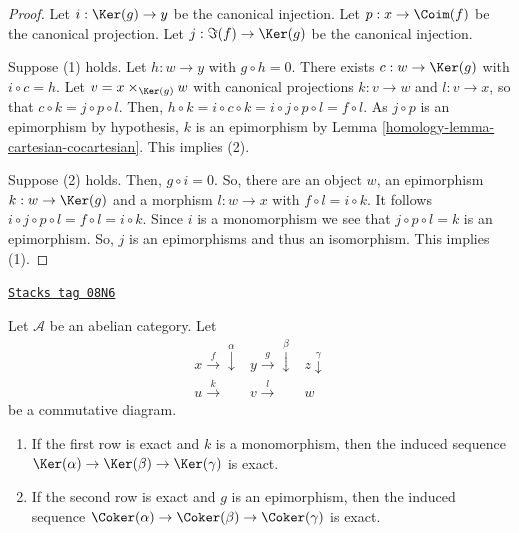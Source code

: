 \begin{proof}

Let $i:\Ker(g)\to y$ be the canonical injection. Let
$p:x\to\Coim(f)$ be the canonical projection. Let
$j:\Im(f)\to\Ker(g)$ be the canonical injection.

\medskip\noindent
Suppose (1) holds. Let $h:w\to y$ with $g\circ h=0$. There exists
$c:w\to\Ker(g)$ with $i\circ c=h$.
Let $v=x\times_{\Ker(g)}w$ with canonical projections
$k:v\to w$ and $l:v\to x$, so that $c\circ k=j\circ p\circ l$.
Then, $h\circ k=i\circ c\circ k=i\circ j\circ p\circ l=f\circ l$.
As $j\circ p$ is an epimorphism by hypothesis, $k$ is an
epimorphism by Lemma \ref{homology-lemma-cartesian-cocartesian}. This implies (2).

\medskip\noindent
Suppose (2) holds. Then, $g\circ i=0$. So, there are an object
$w$, an epimorphism $k:w\to\Ker(g)$ and a morphism
$l:w\to x$ with $f\circ l=i\circ k$. It follows
$i\circ j\circ p\circ l=f\circ l=i\circ k$. Since $i$ is a
monomorphism we see that $j\circ p\circ l=k$ is an epimorphism.
So, $j$ is an epimorphisms and thus an isomorphism. This implies (1).
\end{proof}

\begin{lemma}
\label{homology-lemma-exact-kernel-sequence}
\href{https://stacks.math.columbia.edu/tag/08N6}{\texttt{Stacks tag 08N6}}

Let $\mathcal{A}$ be an abelian category. Let
$$
\begin{array}{ccc}x \overset{f}{\longrightarrow}\overset{\alpha}{\downarrow} & y \overset{g}{\longrightarrow}\overset{\beta}{\downarrow} & z \overset{\gamma}{\downarrow} \\ u \overset{k}{\longrightarrow} & v \overset{l}{\longrightarrow} & w\end{array}
$$
be a commutative diagram.
\begin{enumerate}
\item If the first row is exact and $k$ is a monomorphism, then the induced
sequence $\Ker(\alpha) \to \Ker(\beta) \to \Ker(\gamma)$
is exact.
\item If the second row is exact and $g$ is an epimorphism, then the induced
sequence
$\Coker(\alpha) \to \Coker(\beta) \to \Coker(\gamma)$
is exact.
\end{enumerate}
\end{lemma}

